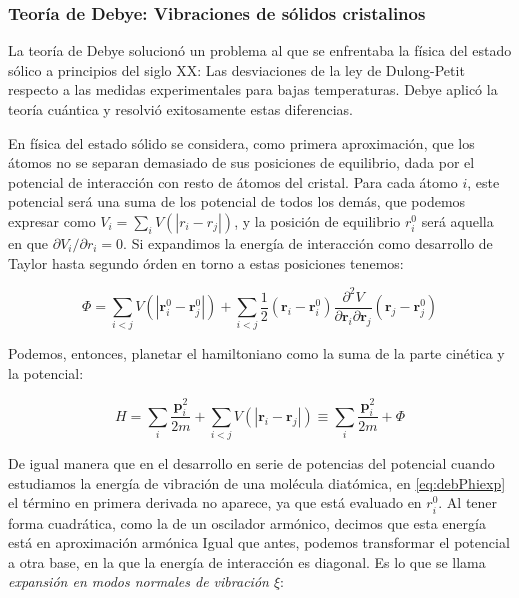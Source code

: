 \documentclass[11pt, a4paper]{article} %
\theoremstyle{named}
\begin{document}
\subsubsection{Teoría de Debye: Vibraciones de sólidos cristalinos}\label{sec:debye}

La teoría de Debye solucionó un problema al que se enfrentaba la física del estado sólico a principios del siglo XX: Las desviaciones de la ley de Dulong-Petit respecto a las medidas experimentales para bajas temperaturas. Debye aplicó la teoría cuántica y resolvió exitosamente estas diferencias.

En física del estado sólido se considera, como primera aproximación, que los átomos no se separan demasiado de sus posiciones de equilibrio, dada por el potencial de interacción con resto de átomos del cristal. Para cada átomo $i$, este potencial será una suma de los potencial de todos los demás, que podemos expresar como $V_i = \sum_i V(|r_i - r_j|)$, y la posición de equilibrio $r_i^0$ será aquella en que $\partial V_i/\partial r_i = 0$. Si expandimos la energía de interacción como desarrollo de Taylor hasta segundo órden en torno a estas posiciones tenemos:

\begin{equation}\label{eq:debPhiexp}
    \Phi=\sum_{i<j} V\left(\left|\mathbf{r}_{i}^{0}-\mathbf{r}_{j}^{0}\right|\right)+\sum_{i<j} \frac{1}{2}\left(\mathbf{r}_{i}-\mathbf{r}_{i}^{0}\right) \frac{\partial^{2} V}{\partial \mathbf{r}_{i} \partial \mathbf{r}_{j}}\left(\mathbf{r}_{j}-\mathbf{r}_{j}^{0}\right)
\end{equation}

Podemos, entonces, planetar el hamiltoniano como la suma de la parte cinética y la potencial:

$$
H=\sum_{i} \frac{\mathbf{p}_{i}^{2}}{2 m}+\sum_{i<j} V\left(\left|\mathbf{r}_{i}-\mathbf{r}_{j}\right|\right) \equiv \sum_{i} \frac{\mathbf{p}_{i}^{2}}{2 m}+\Phi
$$

De igual manera que en el desarrollo en serie de potencias del potencial cuando estudiamos la energía de vibración de una molécula diatómica, en \eqref{eq:debPhiexp} el término en primera derivada no aparece, ya que está evaluado en $r_i^0$. Al tener forma cuadrática, como la de un oscilador armónico, decimos que esta energía está en aproximación armónica Igual que antes, podemos transformar el potencial a otra base, en la que la energía de interacción es diagonal. Es lo que se llama \textit{expansión en modos normales de vibración $\xi$}:
\end{document}
